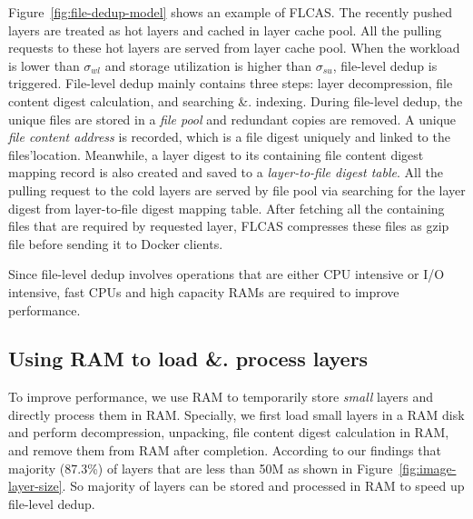 Figure~\ref{fig:file-dedup-model} shows an example of FLCAS.
%
%
%
The recently pushed layers are treated as hot layers and cached in layer cache pool. 
All the pulling requests to these hot layers are served from layer cache pool.
When the workload is lower than $\sigma_{wl}$ and storage utilization is higher than $\sigma_{su}$, file-level dedup is triggered. 
File-level dedup mainly contains three steps: layer decompression, file content digest calculation, and searching \&. indexing.
During file-level dedup, the unique files are stored in a \textit{file pool} and redundant copies are removed.  
A unique \textit{file content address} is recorded, which is a
file digest uniquely and linked to the files'location.
Meanwhile, a layer digest to its containing file content digest mapping record is also created and saved to a \textit{layer-to-file digest table}. 
 All the pulling request to the cold layers are served by file pool via searching for the layer digest from layer-to-file digest mapping table. After fetching all the containing files that are required by requested layer, FLCAS compresses these files as gzip file before sending it to Docker clients.         


Since file-level dedup involves operations that are either CPU intensive or I/O intensive, fast CPUs and high capacity RAMs are required to improve performance.

\subsection{Using RAM to load \&. process layers}

To improve performance, we use RAM to temporarily store \textit{small} layers and directly process them in RAM.
Specially, we first load small layers in a RAM disk and perform decompression, unpacking, file content digest calculation in RAM, and remove them from RAM after completion.   
According to our findings that majority (87.3\%) of layers that are less than 50M as shown in Figure~\ref{fig:image-layer-size}. So majority of layers can be stored and processed in RAM to speed up file-level dedup. 
%
%

